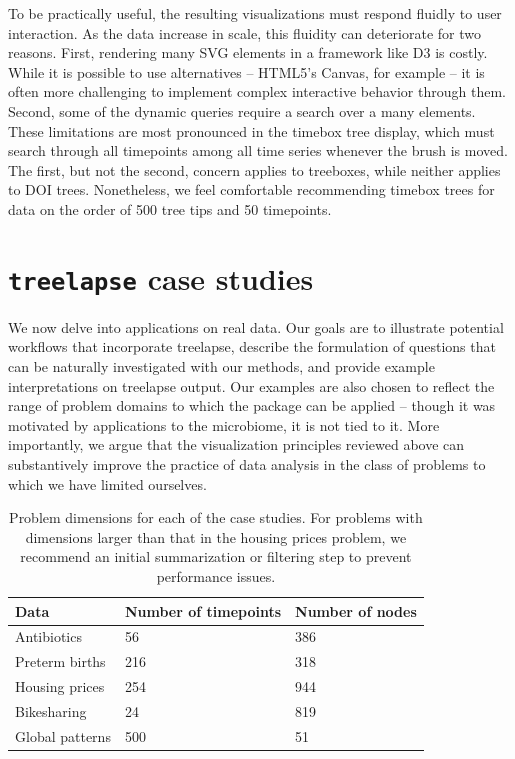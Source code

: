 \documentclass{report}
\begin{document}
To be practically useful, the resulting visualizations must respond fluidly to
user interaction. As the data increase in scale, this fluidity can deteriorate
for two reasons. First, rendering many SVG elements in a framework like D3 is
costly\citep{johnson2008scalability}. While it is possible to use alternatives
-- HTML5's Canvas, for example -- it is often more challenging to implement
complex interactive behavior through them. Second, some of the dynamic queries
require a search over a many elements. These limitations are most pronounced in
the timebox tree display, which must search through all timepoints among all
time series whenever the brush is moved. The first, but not the second, concern
applies to treeboxes, while neither applies to DOI trees. Nonetheless, we feel
comfortable recommending timebox trees for data on the order of 500 tree tips
and 50 timepoints.


\section{\texttt{treelapse} case studies}

We now delve into applications on real data. Our goals are to illustrate
potential workflows that incorporate treelapse, describe the formulation of
questions that can be naturally investigated with our methods, and provide
example interpretations on treelapse output. Our examples are also chosen to
reflect the range of problem domains to which the package can be applied --
though it was motivated by applications to the microbiome, it is not tied to it.
More importantly, we argue that the visualization principles reviewed above can
substantively improve the practice of data analysis in the class of problems to
which we have limited ourselves.

\begin{table}
\centering
\begin{tabular}{|l|l|l|}
  \hline
  Data            & Number of timepoints & Number of nodes \\
  \hline
  Antibiotics     & 56                 & 386             \\
  Preterm births  & 216                & 318             \\
  Housing prices  & 254                & 944             \\
  Bikesharing     & 24                 & 819             \\
  Global patterns & 500                & 51             \\
  \hline
\end{tabular}
\caption{Problem dimensions for each of the case studies. For problems with
  dimensions larger than that in the housing prices problem, we recommend an
  initial summarization or filtering step to prevent performance
  issues. \label{problem-scaling}}
\end{table}
\end{document}
